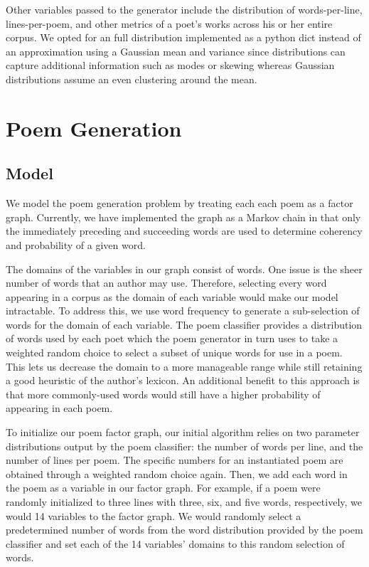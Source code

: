 \documentclass[journal]{IEEEtran}
\begin{document}
Other variables passed to the generator include the distribution of words-per-line, lines-per-poem, and other metrics of a poet's works across his or her entire corpus. We opted for an full distribution implemented as a python dict instead of an approximation using a Gaussian mean and variance since distributions can capture additional information such as modes or skewing whereas Gaussian distributions assume an even clustering around the mean. 

\section{Poem Generation}
\subsection{Model}
We model the poem generation problem by treating each each poem as a factor graph. Currently, we have implemented the graph as a Markov chain in that only the immediately preceding and succeeding words are used to determine coherency and probability of a given word.

The domains of the variables in our graph consist of words. One issue is the sheer number of words that an author may use. Therefore, selecting every word appearing in a corpus as the domain of each variable would make our model intractable. To address this, we use word frequency to generate a sub-selection of words for the domain of each variable. The poem classifier provides a distribution of words used by each poet which the poem generator in turn uses to take a weighted random choice to select a subset of unique words for use in a poem. This lets us decrease the domain to a more manageable range while still retaining a good heuristic of the author’s lexicon. An additional benefit to this approach is that more commonly-used words would still have a higher probability of appearing in each poem. 

To initialize our poem factor graph, our initial algorithm relies on two parameter distributions output by the poem classifier: the number of words per line, and the number of lines per poem. The specific numbers for an instantiated poem are obtained through a weighted random choice again. Then, we add each word in the poem as a variable in our factor graph. For example, if a poem were randomly initialized to three lines with three, six, and five words, respectively, we would 14 variables to the factor graph. We would randomly select a predetermined number of words from the word distribution provided by the poem classifier and set each of the 14 variables' domains to this random selection of words.
\end{document}

